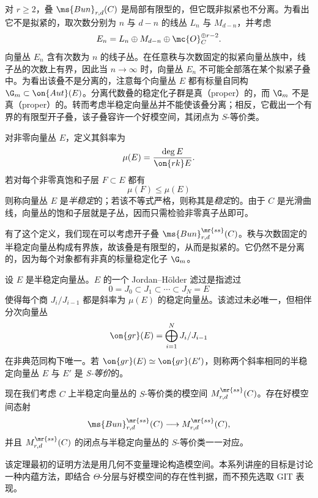 对 \(r\geq 2\)，叠 \(\ms{Bun}_{r,d}(C)\) 是局部有限型的，但它既非拟紧也不分离。为看出它不是拟紧的，取次数分别为 \(n\) 与 \(d-n\) 的线丛 \(L_n\) 与 \(M_{d-n}\)，并考虑
\[
    E_n=L_n\oplus M_{d-n}\oplus\mc{O}_C^{\oplus r-2}.
\]
向量丛 \(E_n\) 含有次数为 \(n\) 的线子丛。在任意秩与次数固定的拟紧向量丛族中，线子丛的次数上有界，因此当 \(n\to\infty\) 时，向量丛 \(E_n\) 不可能全部落在某个拟紧子叠中。为看出该叠不是分离的，注意每个向量丛 \(E\) 都有标量自同构 \(\G_m\subset\on{Aut}(E)\)。分离代数叠的稳定化子群是真（proper）的，而 \(\G_m\) 不是真（proper）的。转而考虑半稳定向量丛并不能使该叠分离；相反，它截出一个有界的有限型开子叠，该子叠容许一个好模空间，其闭点为 \(S\)-等价类。

\begin{defn}[斜率稳定性]
    对非零向量丛 \(E\)，定义其斜率为
    \[ \mu(E)=\frac{\deg E}{\on{rk}E}. \]
    若对每个非零真饱和子层 \(F\subset E\) 都有
    \[ \mu(F)\leq\mu(E) \]
    则称向量丛 \(E\) 是\textit{半稳定}的；若该不等式严格，则称其是\textit{稳定}的。由于 \(C\) 是光滑曲线，向量丛的饱和子层就是子丛，因而只需检验非零真子丛即可。
\end{defn}

有了这个定义，我们现在可以考虑开子叠 \(\ms{Bun}_{r,d}^{\mr{ss}}(C)\)。秩与次数固定的半稳定向量丛构成有界族，故该叠是有限型的，从而是拟紧的。它仍然不是分离的，因为每个对象都有非真的标量稳定化子 \(\G_m\)。

\begin{defn}[S-等价]
    设 \(E\) 是半稳定向量丛。\(E\) 的一个 Jordan--H\"older 滤过是指滤过
    \[ 0=J_0\subset J_1\subset\cdots\subset J_N=E \]
    使得每个商 \(J_i/J_{i-1}\) 都是斜率为 \(\mu(E)\) 的稳定向量丛。该滤过未必唯一，但相伴分次向量丛
    \[
        \on{gr}(E)=\bigoplus_{i=1}^N J_i/J_{i-1}
    \]
    在非典范同构下唯一。若 \(\on{gr}(E)\simeq\on{gr}(E')\)，则称两个斜率相同的半稳定向量丛 \(E\) 与 \(E'\) 是 \textit{S-等价}的。
\end{defn}

现在我们考虑 \(C\) 上半稳定向量丛的 \(S\)-等价类的模空间 \(M_{r,d}^{\mr{ss}}(C)\)。存在好模空间态射
\[
    \ms{Bun}_{r,d}^{\mr{ss}}(C)\longrightarrow M_{r,d}^{\mr{ss}}(C),
\]
并且 \(M_{r,d}^{\mr{ss}}(C)\) 的闭点与半稳定向量丛的 \(S\)-等价类一一对应。

\begin{rmk}
    该定理最初的证明方法是用几何不变量理论构造模空间。本系列讲座的目标是讨论一种内蕴方法，即结合 \(\Theta\)-分层与好模空间的存在性判据，而不预先选取 GIT 表现。
\end{rmk}


